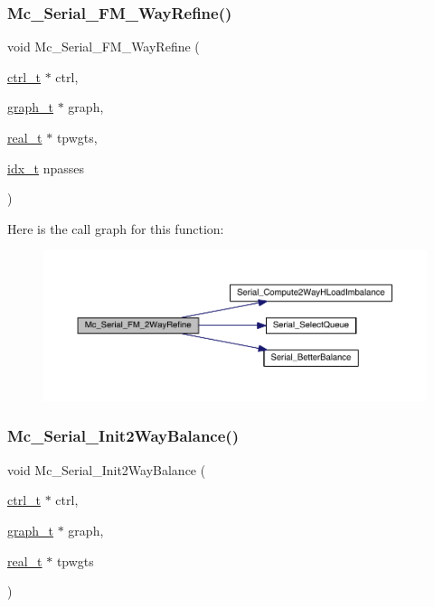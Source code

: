 \mbox{\label{a00407_a9e8699c39f355dea5ad38e1dfee7b7cf}} 
\subsubsection{\texorpdfstring{Mc\+\_\+\+Serial\+\_\+\+F\+M\+\_\+Way\+Refine()}{Mc\_Serial\_FM\_2WayRefine()}}
{\footnotesize\ttfamily void Mc\+\_\+\+Serial\+\_\+\+F\+M\+\_\+Way\+Refine (\begin{DoxyParamCaption}\item[{\hyperlink{a00742}{ctrl\+\_\+t} $\ast$}]{ctrl,  }\item[{\hyperlink{a00734}{graph\+\_\+t} $\ast$}]{graph,  }\item[{\hyperlink{a00876_a1924a4f6907cc3833213aba1f07fcbe9}{real\+\_\+t} $\ast$}]{tpwgts,  }\item[{\hyperlink{a00876_aaa5262be3e700770163401acb0150f52}{idx\+\_\+t}}]{npasses }\end{DoxyParamCaption})}

Here is the call graph for this function\+:\nopagebreak
\begin{figure}[H]
\begin{center}
\leavevmode
\includegraphics[width=350pt]{a00407_a9e8699c39f355dea5ad38e1dfee7b7cf_cgraph}
\end{center}
\end{figure}
\mbox{\label{a00407_ad376cf99d1d14ec6aeecf466359ce898}} 
\subsubsection{\texorpdfstring{Mc\+\_\+\+Serial\+\_\+\+Init2\+Way\+Balance()}{Mc\_Serial\_Init2WayBalance()}}
{\footnotesize\ttfamily void Mc\+\_\+\+Serial\+\_\+\+Init2\+Way\+Balance (\begin{DoxyParamCaption}\item[{\hyperlink{a00742}{ctrl\+\_\+t} $\ast$}]{ctrl,  }\item[{\hyperlink{a00734}{graph\+\_\+t} $\ast$}]{graph,  }\item[{\hyperlink{a00876_a1924a4f6907cc3833213aba1f07fcbe9}{real\+\_\+t} $\ast$}]{tpwgts }\end{DoxyParamCaption})}

